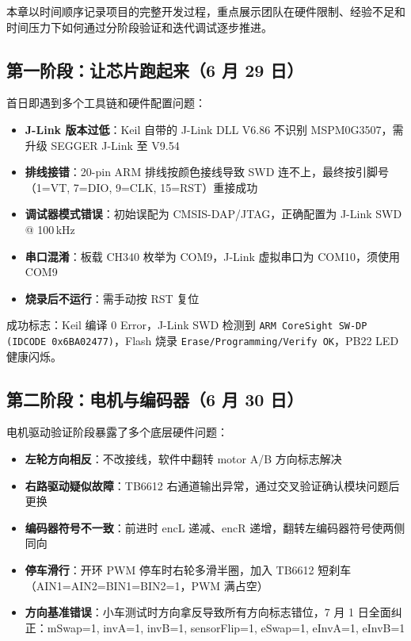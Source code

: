 \documentclass[12pt,a4paper]{ctexart}
\begin{document}
本章以时间顺序记录项目的完整开发过程，重点展示团队在硬件限制、经验不足和时间压力下如何通过分阶段验证和迭代调试逐步推进。

\subsection{第一阶段：让芯片跑起来（6 月 29 日）}

首日即遇到多个工具链和硬件配置问题：

\begin{itemize}
    \item \textbf{J-Link 版本过低}：Keil 自带的 J-Link DLL V6.86 不识别 MSPM0G3507，需升级 SEGGER J-Link 至 V9.54
    \item \textbf{排线接错}：20-pin ARM 排线按颜色接线导致 SWD 连不上，最终按引脚号（1=VT, 7=DIO, 9=CLK, 15=RST）重接成功
    \item \textbf{调试器模式错误}：初始误配为 CMSIS-DAP/JTAG，正确配置为 J-Link SWD @ 100\,kHz
    \item \textbf{串口混淆}：板载 CH340 枚举为 COM9，J-Link 虚拟串口为 COM10，须使用 COM9
    \item \textbf{烧录后不运行}：需手动按 RST 复位
\end{itemize}

成功标志：Keil 编译 0 Error，J-Link SWD 检测到 \texttt{ARM CoreSight SW-DP (IDCODE 0x6BA02477)}，Flash 烧录 \texttt{Erase/Programming/Verify OK}，PB22 LED 健康闪烁。

\subsection{第二阶段：电机与编码器（6 月 30 日）}

电机驱动验证阶段暴露了多个底层硬件问题：

\begin{itemize}
    \item \textbf{左轮方向相反}：不改接线，软件中翻转 motor A/B 方向标志解决
    \item \textbf{右路驱动疑似故障}：TB6612 右通道输出异常，通过交叉验证确认模块问题后更换
    \item \textbf{编码器符号不一致}：前进时 encL 递减、encR 递增，翻转左编码器符号使两侧同向
    \item \textbf{停车滑行}：开环 PWM 停车时右轮多滑半圈，加入 TB6612 短刹车（AIN1=AIN2=BIN1=BIN2=1，PWM 满占空）
    \item \textbf{方向基准错误}：小车测试时方向拿反导致所有方向标志错位，7 月 1 日全面纠正：mSwap=1, invA=1, invB=1, sensorFlip=1, eSwap=1, eInvA=1, eInvB=1
\end{itemize}
\end{document}
